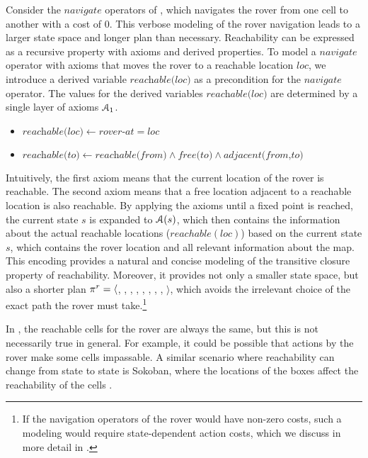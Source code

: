 \begin{example}\label{ex:axioms}
    Consider the $\textit{navigate}$ operators of , which navigates the rover from one cell to another with a cost of 0. This verbose modeling of the rover navigation leads to a larger state space and longer plan than necessary. Reachability can be expressed as a recursive property with axioms and derived properties.
    To model a $\textit{navigate}$ operator with axioms that moves the rover to a reachable location $loc$, we introduce a derived variable $\textit{reachable(loc)}$ as a precondition for the $\textit{navigate}$ operator. The values for the derived variables $\textit{reachable(loc)}$ are determined by a single layer of axioms $\mathcal A_1$.
    \begin{itemize}
        \item $\textit{reachable(loc)} \leftarrow \textit{rover-at}=loc$
        \item $\textit{reachable(to)} \leftarrow \textit{reachable(from)} \land \textit{free(to)} \land \textit{adjacent(from,to)}$
    \end{itemize}

    Intuitively, the first axiom means that the current location of the rover is reachable. The second axiom means that a free location adjacent to a reachable location is also reachable. By applying the axioms until a fixed point is reached, the current state $s$ is expanded to $\mathcal A(s)$, which then contains the information about the actual reachable locations ($reachable(loc)$) based on the current state $s$, which contains the rover location and all relevant information about the map.
    This encoding provides a natural and concise modeling of the transitive closure property of reachability. Moreover, it provides not only a smaller state space, but also a shorter plan $\pi^r{} = \langle$, , , , , , , , $\rangle$, which avoids the irrelevant choice of the exact path the rover must take.\footnote{If the navigation operators of the rover would have non-zero costs, such a modeling would require state-dependent action costs, which we discuss in more detail in .}
\end{example}

In , the reachable cells for the rover are always the same, but this is not necessarily true in general. For example, it could be possible that actions by the rover make some cells impassable.  A similar scenario where reachability can change from state to state is Sokoban, where the locations of the boxes affect the reachability of the cells \autocite{ivankovic-haslum-ijcai2015,miura-fukunaga-aaai2017}.

